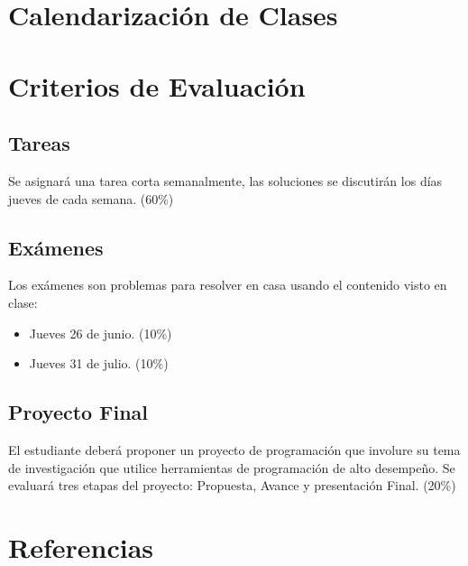 \documentclass[letterpaper]{article}
\begin{document}
\section{Calendarización de Clases}

\section{Criterios de Evaluación}
\subsection{Tareas}
Se asignará una tarea corta semanalmente, las soluciones se discutirán los días jueves de cada semana. (60\%)
\subsection{Exámenes}
Los exámenes son problemas para resolver en casa usando el contenido visto en clase:
\begin{itemize}
    \item Jueves 26 de junio. (10\%)
    \item Jueves 31 de julio. (10\%)
\end{itemize}
\subsection{Proyecto Final}
El estudiante deberá proponer un proyecto de programación que involure su tema de investigación que utilice herramientas de programación de alto desempeño. Se evaluará tres etapas del proyecto: Propuesta, Avance y presentación Final. (20\%)

\section{Referencias}
\end{document}
